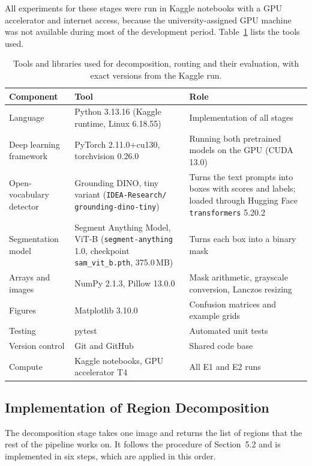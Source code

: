 \documentclass{FastFyp}
\begin{document}
All experiments for these stages were run in Kaggle notebooks with a GPU accelerator and internet access, because the university-assigned GPU machine was not available during most of the development period. Table~\ref{tab:a_tools} lists the tools used.

\begin{table}[!ht]
\centering
\caption{Tools and libraries used for decomposition, routing and their evaluation, with exact versions from the Kaggle run.}
\label{tab:a_tools}
\begin{tabular}{|p{2.6cm}|>{\raggedright\arraybackslash}p{5.4cm}|>{\raggedright\arraybackslash}p{4.4cm}|}
\hline
\textbf{Component} & \textbf{Tool} & \textbf{Role} \\ \hline
Language & Python 3.13.16 (Kaggle runtime, Linux 6.18.55) & Implementation of all stages \\ \hline
Deep learning framework & PyTorch 2.11.0+cu130, torchvision 0.26.0 & Running both pretrained models on the GPU (CUDA 13.0) \\ \hline
Open-vocabulary detector & Grounding DINO, tiny variant (\texttt{IDEA-Research/} \texttt{grounding-dino-tiny}) \cite{liu2024groundingdino} & Turns the text prompts into boxes with scores and labels; loaded through Hugging Face \texttt{transformers} 5.20.2 \\ \hline
Segmentation model & Segment Anything Model, ViT-B (\texttt{segment-anything} 1.0, checkpoint \texttt{sam\_vit\_b.pth}, 375.0\,MB) \cite{kirillov2023sam} & Turns each box into a binary mask \\ \hline
Arrays and images & NumPy 2.1.3, Pillow 13.0.0 & Mask arithmetic, grayscale conversion, Lanczos resizing \\ \hline
Figures & Matplotlib 3.10.0 & Confusion matrices and example grids \\ \hline
Testing & pytest & Automated unit tests \\ \hline
Version control & Git and GitHub & Shared code base \\ \hline
Compute & Kaggle notebooks, GPU accelerator T4 & All E1 and E2 runs \\ \hline
\end{tabular}
\end{table}


\subsection{Implementation of Region Decomposition}
The decomposition stage takes one image and returns the list of regions that the rest of the pipeline works on. It follows the procedure of Section~5.2 and is implemented in six steps, which are applied in this order.
 
\end{document}
